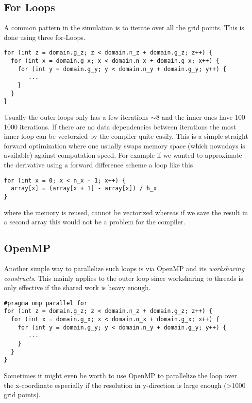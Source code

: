\subsection{For Loops}
A common pattern in the simulation is to iterate over all the grid points.
This is done using three for-Loops.
\begin{lstlisting}
for (int z = domain.g_z; z < domain.n_z + domain.g_z; z++) {
  for (int x = domain.g_x; x < domain.n_x + domain.g_x; x++) {
    for (int y = domain.g_y; y < domain.n_y + domain.g_y; y++) {
       ...
    }
  }
}
\end{lstlisting}
Usually the outer loops only has a few iterations $\sim 8$ and the inner ones have 100-1000 iterations. 
If there are no data dependencies between iterations the most inner loop can be vectorzied by the compiler quite easily. This is a simple straight forward optimization where one usually swaps memory space (which nowadays is available) against computation speed. For example if we wanted to approximate the derivative using a forward difference scheme a loop like this
\begin{lstlisting}
for (int x = 0; x < n_x - 1; x++) {
  array[x] = (array[x + 1] - array[x]) / h_x    
}
\end{lstlisting}
where the memory is reused, cannot be vectorized whereas if we save the result in a second array this would not be a problem for the compiler.
\subsection{OpenMP}
Another simple way to parallelize such loops is via OpenMP and its \textit{worksharing constructs}. This mainly applies to the outer loop since worksharing to threads is only effective if the shared work is heavy enough.
\begin{lstlisting}
#pragma omp parallel for
for (int z = domain.g_z; z < domain.n_z + domain.g_z; z++) {
  for (int x = domain.g_x; x < domain.n_x + domain.g_x; x++) {
    for (int y = domain.g_y; y < domain.n_y + domain.g_y; y++) {
       ...
    }
  }
}
\end{lstlisting}
Sometimes it might even be worth to use OpenMP to parallelize the loop over the x-coordinate especially if the resolution in y-direction is large enough (\textgreater 1000 grid points).


